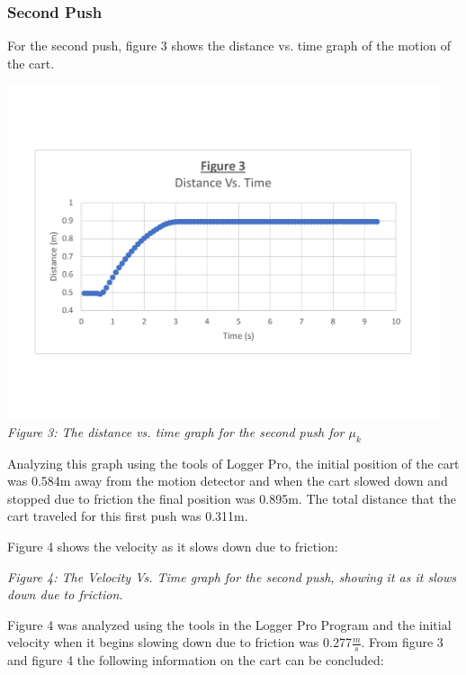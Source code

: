 \documentclass[aps,letterpaper,11pt]{revtex4}
\begin{document}
\subsubsection{Second Push}

For the second push, figure 3 shows the distance vs. time graph of the motion of the cart. 

\begin{center}
\includegraphics[width=5in]{DistanceVsTimeGraphForMuSecond.pdf}\\
\textit{Figure 3: The distance vs. time graph for the second push for $\mu_k$}\\
\end{center}

Analyzing this graph using the tools of Logger Pro, the initial position of the cart was 0.584m away from the motion detector and when the cart slowed down and stopped due to friction the final position was 0.895m. The total distance that the cart traveled for this first push was 0.311m.

Figure 4 shows the velocity as it slows down due to friction:

\begin{center}

\textit{Figure 4: The Velocity Vs. Time graph for the second push, showing it as it slows down due to friction.}\\
\end{center}

Figure 4 was analyzed using the tools in the Logger Pro Program and the initial velocity when it begins slowing down due to friction was 0.277$\frac{m}{s}$. From figure 3 and figure 4 the following information on the cart can be concluded:
\end{document}
